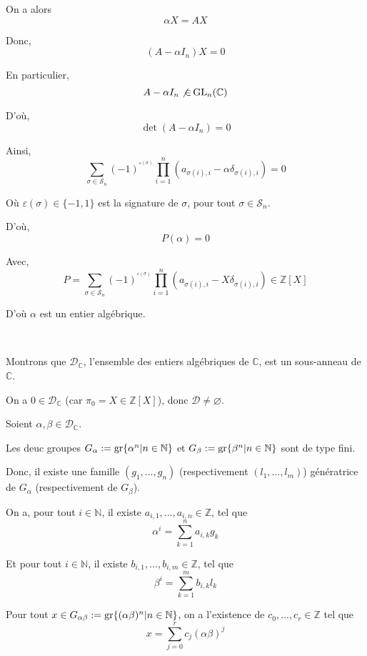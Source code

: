 On a alors
\[ \alpha X = A X \]


Donc,
\[ (A - \alpha I_n) X = 0 \]


En particulier,
\[ A - \alpha I_n \not{\in} \operatorname{GL}_n (\mathbb{C}) \]


D'o{\`u},
\[ \det (A - \alpha I_n) = 0 \]


Ainsi,
\[ \underset{\sigma \in \mathcal{S}_n}{\sum} (- 1)^{^{\varepsilon (\sigma)}}
   \underset{i = 1}{\overset{n}{\prod}} (a_{\sigma (i), i} - \alpha
   \delta_{\sigma (i), i}) = 0 \]


O{\`u} $\varepsilon (\sigma) \in \{ - 1, 1 \}$ est la signature de $\sigma$,
pour tout $\sigma \in \mathcal{S}_n .$

D'o{\`u},
\[ P (\alpha) = 0 \]


Avec,
\[ P = \underset{\sigma \in \mathcal{S}_n}{\sum} (- 1)^{^{\varepsilon
   (\sigma)}} \underset{i = 1}{\overset{n}{\prod}} (a_{\sigma (i), i} - X
   \delta_{\sigma (i), i}) \in \mathbb{Z} [X] \]


D'o{\`u} $\alpha$ est un entier alg{\'e}brique.

\

 Montrons que $\mathcal{D}_{\mathbb{C}}$, l'ensemble des entiers
alg{\'e}briques de $\mathbb{C}$, est un sous-anneau de $\mathbb{C}$.

On a $0 \in \mathcal{D}_{\mathbb{C}}$ (car $\pi_0 = X \in \mathbb{Z} [X]$),
donc \ensuremath{\mathcal{D}}$\neq
\varnothing$.

Soient $\alpha, \beta \in \mathcal{D}_{\mathbb{C}}$.

Les deuc groupes $G_{\alpha} : = \operatorname{gr} \{ \alpha^n  |  n \in
\mathbb{N} \}$ et $G_{\beta} : = \operatorname{gr} \{ \beta^n |  n \in
\mathbb{N} \}$ sont de type fini.

Donc, il existe une famille $(g_1, \ldots, g_n)$ (respectivement $(l_1,
\ldots, l_m)$) g{\'e}n{\'e}ratrice de $G_{\alpha}$ (respectivement de
$G_{\beta}$).

On a, pour tout $i \in \mathbb{N}$, il existe $a_{i, 1}, \ldots, a_{i, n} \in
\mathbb{Z}$, tel que
\[ \alpha^i = \underset{k = 1}{\overset{n}{\sum}} a_{i, k} g_k \]


Et pour tout $i \in \mathbb{N}$, il existe $b_{i, 1}, \ldots, b_{i, m} \in
\mathbb{Z}$, tel que
\[ \beta^i = \underset{k = 1}{\overset{m}{\sum}} b_{i, k} l_k \]


Pour tout $x \in G_{\alpha \beta} : = \operatorname{gr} \{ (\alpha \beta)^n |
 n \in \mathbb{N} \}$, on a l'existence de $c_0, \ldots, c_r \in
\mathbb{Z}$ tel que
\[ x = \underset{j = 0}{\overset{r}{\sum}} c_j (\alpha \beta)^j \]


